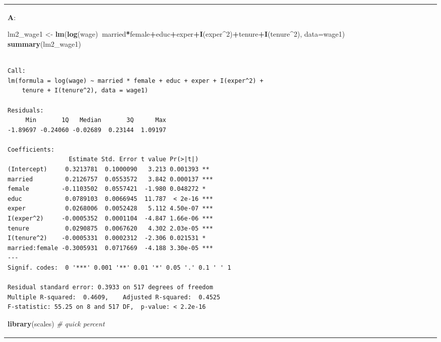 \documentclass[12pt,]{article}
\newenvironment{Shaded}{\begin{snugshade}}{\end{snugshade}}
\newcommand{\CommentTok}[1]{\textcolor[rgb]{0.56,0.35,0.01}{\textit{#1}}}
\newcommand{\DataTypeTok}[1]{\textcolor[rgb]{0.13,0.29,0.53}{#1}}
\newcommand{\DecValTok}[1]{\textcolor[rgb]{0.00,0.00,0.81}{#1}}
\newcommand{\KeywordTok}[1]{\textcolor[rgb]{0.13,0.29,0.53}{\textbf{#1}}}
\newcommand{\NormalTok}[1]{#1}
\newcommand{\OperatorTok}[1]{\textcolor[rgb]{0.81,0.36,0.00}{\textbf{#1}}}
\newcommand{\StringTok}[1]{\textcolor[rgb]{0.31,0.60,0.02}{#1}}
\begin{document}
\begin{tabularx}{0.5\textwidth}{p{} p{} p{} p{}}
\textbf{A}:

\begin{Shaded}
\begin{Highlighting}[]
\NormalTok{lm2_wage1 <-}\StringTok{ }\KeywordTok{lm}\NormalTok{(}\KeywordTok{log}\NormalTok{(wage)}\OperatorTok{~}\NormalTok{married}\OperatorTok{*}\NormalTok{female}\OperatorTok{+}\NormalTok{educ}\OperatorTok{+}\NormalTok{exper}\OperatorTok{+}\KeywordTok{I}\NormalTok{(exper}\OperatorTok{^}\DecValTok{2}\NormalTok{)}\OperatorTok{+}\NormalTok{tenure}\OperatorTok{+}\KeywordTok{I}\NormalTok{(tenure}\OperatorTok{^}\DecValTok{2}\NormalTok{), }\DataTypeTok{data=}\NormalTok{wage1)}
\KeywordTok{summary}\NormalTok{(lm2_wage1)}
\end{Highlighting}
\end{Shaded}

\begin{verbatim}

Call:
lm(formula = log(wage) ~ married * female + educ + exper + I(exper^2) + 
    tenure + I(tenure^2), data = wage1)

Residuals:
     Min       1Q   Median       3Q      Max 
-1.89697 -0.24060 -0.02689  0.23144  1.09197 

Coefficients:
                 Estimate Std. Error t value Pr(>|t|)    
(Intercept)     0.3213781  0.1000090   3.213 0.001393 ** 
married         0.2126757  0.0553572   3.842 0.000137 ***
female         -0.1103502  0.0557421  -1.980 0.048272 *  
educ            0.0789103  0.0066945  11.787  < 2e-16 ***
exper           0.0268006  0.0052428   5.112 4.50e-07 ***
I(exper^2)     -0.0005352  0.0001104  -4.847 1.66e-06 ***
tenure          0.0290875  0.0067620   4.302 2.03e-05 ***
I(tenure^2)    -0.0005331  0.0002312  -2.306 0.021531 *  
married:female -0.3005931  0.0717669  -4.188 3.30e-05 ***
---
Signif. codes:  0 '***' 0.001 '**' 0.01 '*' 0.05 '.' 0.1 ' ' 1

Residual standard error: 0.3933 on 517 degrees of freedom
Multiple R-squared:  0.4609,    Adjusted R-squared:  0.4525 
F-statistic: 55.25 on 8 and 517 DF,  p-value: < 2.2e-16
\end{verbatim}

\begin{Shaded}
\begin{Highlighting}[]
\KeywordTok{library}\NormalTok{(scales) }\CommentTok{#  quick percent}
\end{Highlighting}
\end{Shaded}


\end{tabularx}
\end{document}
